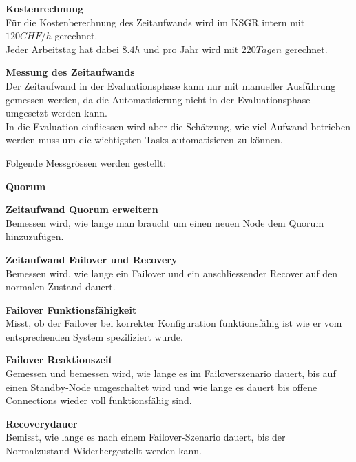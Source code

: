 \begin{flushleft}
    \begin{description}
        \item \textbf{Kostenrechnung}\hfill \\Für die Kostenberechnung des Zeitaufwands wird im KSGR intern mit \(120CHF/h\) gerechnet.\\Jeder Arbeitstag hat dabei \(8.4h\) und pro Jahr wird mit \(220 Tagen\) gerechnet.
        \item \textbf{Messung des Zeitaufwands}\hfill \\Der Zeitaufwand in der Evaluationsphase kann nur mit manueller Ausführung gemessen werden, da die Automatisierung nicht in der Evaluationsphase umgesetzt werden kann.\\In die Evaluation einfliessen wird aber die Schätzung, wie viel Aufwand betrieben werden muss um die wichtigsten Tasks automatisieren zu können.
        \item 
    \end{description}

    Folgende Messgrössen werden gestellt:
    \begin{description}
        \item \textbf{Quorum}\hfill \\
        \item \textbf{Zeitaufwand Quorum erweitern}\hfill \\Bemessen wird, wie lange man braucht um einen neuen Node dem Quorum hinzuzufügen.
        \item \textbf{Zeitaufwand Failover und Recovery}\hfill \\Bemessen wird, wie lange ein Failover und ein anschliessender Recover auf den normalen Zustand dauert.
        \item \textbf{Failover Funktionsfähigkeit}\hfill \\Misst, ob der Failover bei korrekter Konfiguration funktionsfähig ist wie er vom entsprechenden System spezifiziert wurde.
        \item \textbf{Failover Reaktionszeit}\hfill \\Gemessen und bemessen wird, wie lange es im Failoverszenario dauert, bis auf einen Standby-Node umgeschaltet wird und wie lange es dauert bis offene Connections wieder voll funktionsfähig sind.
        \item \textbf{Recoverydauer}\hfill \\Bemisst, wie lange es nach einem Failover-Szenario dauert, bis der Normalzustand Widerhergestellt werden kann.
    \end{description}


\end{flushleft}
